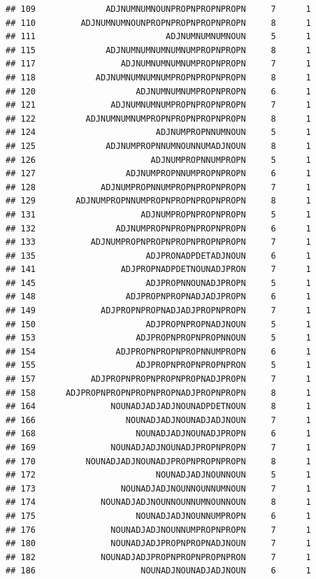 \documentclass[]{article}
\begin{document}
\begin{verbatim}
## 109              ADJNUMNUMNOUNPROPNPROPNPROPN     7      1
## 110         ADJNUMNUMNOUNPROPNPROPNPROPNPROPN     8      1
## 111                          ADJNUMNUMNUMNOUN     5      1
## 115              ADJNUMNUMNUMNUMNUMPROPNPROPN     8      1
## 117                 ADJNUMNUMNUMNUMPROPNPROPN     7      1
## 118            ADJNUMNUMNUMNUMPROPNPROPNPROPN     8      1
## 120                    ADJNUMNUMNUMPROPNPROPN     6      1
## 121               ADJNUMNUMNUMPROPNPROPNPROPN     7      1
## 122          ADJNUMNUMNUMPROPNPROPNPROPNPROPN     8      1
## 124                        ADJNUMPROPNNUMNOUN     5      1
## 125              ADJNUMPROPNNUMNOUNNUMADJNOUN     8      1
## 126                       ADJNUMPROPNNUMPROPN     5      1
## 127                  ADJNUMPROPNNUMPROPNPROPN     6      1
## 128             ADJNUMPROPNNUMPROPNPROPNPROPN     7      1
## 129        ADJNUMPROPNNUMPROPNPROPNPROPNPROPN     8      1
## 131                     ADJNUMPROPNPROPNPROPN     5      1
## 132                ADJNUMPROPNPROPNPROPNPROPN     6      1
## 133           ADJNUMPROPNPROPNPROPNPROPNPROPN     7      1
## 135                      ADJPRONADPDETADJNOUN     6      1
## 141                 ADJPROPNADPDETNOUNADJPRON     7      1
## 145                      ADJPROPNNOUNADJPROPN     5      1
## 148                  ADJPROPNPROPNADJADJPROPN     6      1
## 149             ADJPROPNPROPNADJADJPROPNPROPN     7      1
## 150                      ADJPROPNPROPNADJNOUN     5      1
## 153                    ADJPROPNPROPNPROPNNOUN     5      1
## 154                ADJPROPNPROPNPROPNNUMPROPN     6      1
## 155                    ADJPROPNPROPNPROPNPRON     5      1
## 157           ADJPROPNPROPNPROPNPROPNADJPROPN     7      1
## 158      ADJPROPNPROPNPROPNPROPNADJPROPNPROPN     8      1
## 164               NOUNADJADJADJNOUNADPDETNOUN     8      1
## 166                  NOUNADJADJNOUNADJADJNOUN     7      1
## 168                    NOUNADJADJNOUNADJPROPN     6      1
## 169               NOUNADJADJNOUNADJPROPNPROPN     7      1
## 170          NOUNADJADJNOUNADJPROPNPROPNPROPN     8      1
## 172                        NOUNADJADJNOUNNOUN     5      1
## 173                 NOUNADJADJNOUNNOUNNUMNOUN     7      1
## 174             NOUNADJADJNOUNNOUNNUMNOUNNOUN     8      1
## 175                    NOUNADJADJNOUNNUMPROPN     6      1
## 176               NOUNADJADJNOUNNUMPROPNPROPN     7      1
## 180               NOUNADJADJPROPNPROPNADJNOUN     7      1
## 182             NOUNADJADJPROPNPROPNPROPNPRON     7      1
## 186                     NOUNADJNOUNADJADJNOUN     6      1

\end{verbatim}
\end{document}
